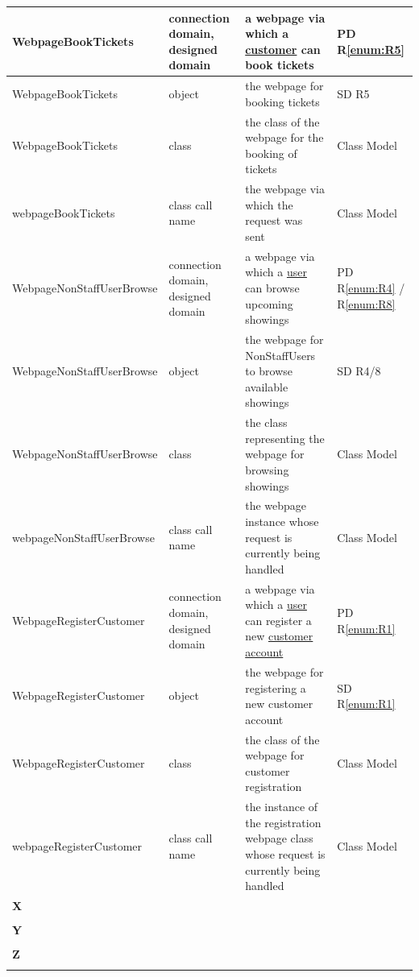 \documentclass[a4paper,10pt,titlepage,bibtotoc,bibtotocnumbered]{scrreprt}
\begin{document}
\begin{longtable}{|p{4cm}|p{3cm}|p{5cm}|l|}
\hline
\hypertarget{glossary:WebpageBookTickets}{WebpageBookTickets} & connection domain, designed domain & a webpage via which a \hyperlink{glossary:Customer}{customer} can book tickets & PD R\ref{enum:R5}\\
\hline
WebpageBookTickets & object & the webpage for booking tickets & SD R5\\
\hline
WebpageBookTickets & class & the class of the webpage for the booking of tickets & Class Model\\
\hline
webpageBookTickets & class call name & the webpage via which the request was sent & Class Model\\
\hline
\hypertarget{glossary:WebpageNonStaffUserBrowse}{WebpageNonStaffUserBrowse} & connection domain, designed domain & a webpage via which a \hyperlink{glossary:NonStaffUser}{user} can browse upcoming showings & PD R\ref{enum:R4} / R\ref{enum:R8}\\
\hline
WebpageNonStaffUserBrowse & object & the webpage for NonStaffUsers to browse available showings & SD R4/8\\
\hline
WebpageNonStaffUserBrowse & class & the class representing the webpage for browsing showings & Class Model\\
\hline
webpageNonStaffUserBrowse & class call name & the webpage instance whose request is currently being handled & Class Model\\
\hline
\hypertarget{glossary:WebpageRegisterCustomer}{WebpageRegisterCustomer} & connection domain, designed domain & a webpage via which a \hyperlink{glossary:User}{user} can register a new \hyperlink{glossary:Customer}{customer account} & PD R\ref{enum:R1}\\
\hline
WebpageRegisterCustomer & object & the webpage for registering a new customer account & SD R\ref{enum:R1}\\
\hline
WebpageRegisterCustomer & class & the class of the webpage for customer registration & Class Model\\
\hline
webpageRegisterCustomer & class call name & the instance of the registration webpage class whose request is currently being handled & Class Model\\
\hline
\multicolumn{4}{|l|}{\textbf{X}}\\
\hline
&  &  & \\
\hline
\multicolumn{4}{|l|}{\textbf{Y}}\\
\hline
&  &  & \\
\hline
\multicolumn{4}{|l|}{\textbf{Z}}\\
\hline
&  &  & \\
\hline
\end{longtable}
\end{document}
